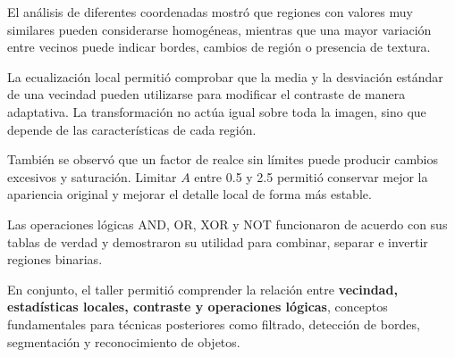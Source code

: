 \documentclass[11pt,letterpaper]{article}
\begin{document}
El análisis de diferentes coordenadas mostró que regiones con valores muy similares pueden considerarse homogéneas, mientras que una mayor variación entre vecinos puede indicar bordes, cambios de región o presencia de textura.

La ecualización local permitió comprobar que la media y la desviación estándar de una vecindad pueden utilizarse para modificar el contraste de manera adaptativa. La transformación no actúa igual sobre toda la imagen, sino que depende de las características de cada región.

También se observó que un factor de realce sin límites puede producir cambios excesivos y saturación. Limitar $A$ entre 0.5 y 2.5 permitió conservar mejor la apariencia original y mejorar el detalle local de forma más estable.

Las operaciones lógicas AND, OR, XOR y NOT funcionaron de acuerdo con sus tablas de verdad y demostraron su utilidad para combinar, separar e invertir regiones binarias.

En conjunto, el taller permitió comprender la relación entre \textbf{vecindad, estadísticas locales, contraste y operaciones lógicas}, conceptos fundamentales para técnicas posteriores como filtrado, detección de bordes, segmentación y reconocimiento de objetos.
\end{document}
